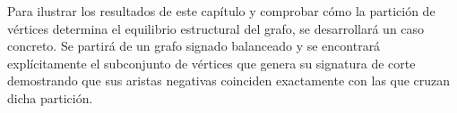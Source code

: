 \documentclass[11pt,a4paper,spanish]{report}
\theoremstyle{plain}
\newtheorem{corolario}[teorema]{Corolario}
\begin{document}

Para ilustrar los resultados de este capítulo y comprobar cómo la partición de vértices determina el equilibrio estructural del grafo, se desarrollará un caso concreto. Se partirá de un grafo signado balanceado y se encontrará explícitamente el subconjunto de vértices que genera su signatura de corte demostrando que sus aristas negativas coinciden exactamente con las que cruzan dicha partición.
\end{document}
